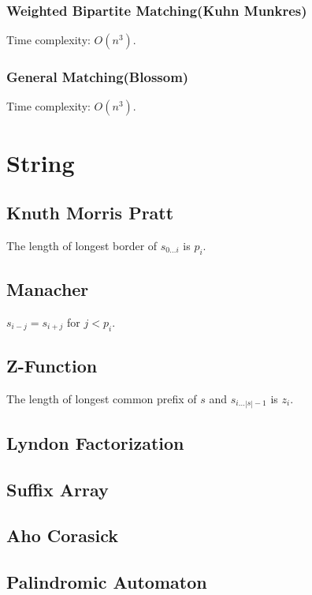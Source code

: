 \documentclass{article}
\begin{document}
        \subsubsection{Weighted Bipartite Matching(Kuhn Munkres)}
            Time complexity: $O(n^3)$.
            
        \subsubsection{General Matching(Blossom)}
            Time complexity: $O(n^3)$.
            
\section{String}
    \subsection{Knuth Morris Pratt}
        The length of longest border of $s_{0\dots i}$ is $p_i$.
        
    \subsection{Manacher}
        $s_{i-j}=s_{i+j}$ for $j<p_i$.
        
    \subsection{Z-Function}
        The length of longest common prefix of $s$ and $s_{i\dots|s|-1}$ is $z_i$.
        
    \subsection{Lyndon Factorization}
        
    \subsection{Suffix Array}
        
    \subsection{Aho Corasick}
        
    \subsection{Palindromic Automaton}
        
\end{document}
